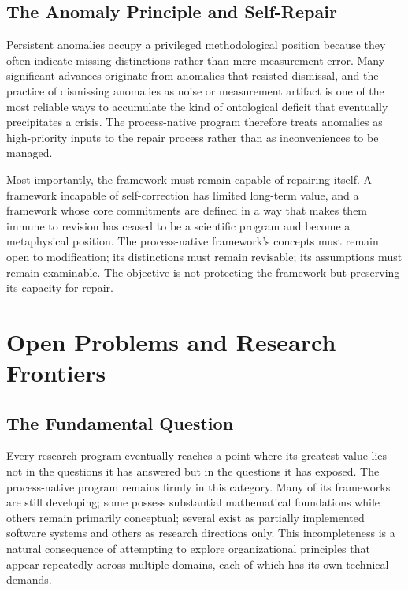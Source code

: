 \documentclass[11pt, oneside]{book}
\theoremstyle{definition}
\theoremstyle{remark}
\begin{document}
\section{The Anomaly Principle and Self-Repair}

Persistent anomalies occupy a privileged methodological position because they often indicate missing distinctions rather than mere measurement error. Many significant advances originate from anomalies that resisted dismissal, and the practice of dismissing anomalies as noise or measurement artifact is one of the most reliable ways to accumulate the kind of ontological deficit that eventually precipitates a crisis. The process-native program therefore treats anomalies as high-priority inputs to the repair process rather than as inconveniences to be managed.

Most importantly, the framework must remain capable of repairing itself. A framework incapable of self-correction has limited long-term value, and a framework whose core commitments are defined in a way that makes them immune to revision has ceased to be a scientific program and become a metaphysical position. The process-native framework's concepts must remain open to modification; its distinctions must remain revisable; its assumptions must remain examinable. The objective is not protecting the framework but preserving its capacity for repair.

\chapter{Open Problems and Research Frontiers}

\section{The Fundamental Question}

Every research program eventually reaches a point where its greatest value lies not in the questions it has answered but in the questions it has exposed. The process-native program remains firmly in this category. Many of its frameworks are still developing; some possess substantial mathematical foundations while others remain primarily conceptual; several exist as partially implemented software systems and others as research directions only. This incompleteness is a natural consequence of attempting to explore organizational principles that appear repeatedly across multiple domains, each of which has its own technical demands.
\end{document}
